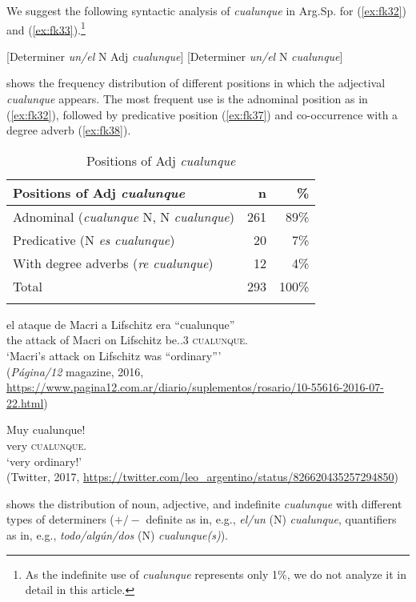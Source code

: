 \documentclass[output=paper,colorlinks,citecolor=brown]{langscibook}
\begin{document}
We suggest the following syntactic analysis of \textit{cualunque} in Arg.Sp. for (\ref{ex:fk32}) and (\ref{ex:fk33}).\footnote{As the indefinite use of \textit{cualunque} represents only 1\%, we do not analyze it in detail in this article.}

\ea\label{ex:fk35} [Determiner \textit{un/el} N Adj \textit{cualunque}] \z
\ea\label{ex:fk36} [Determiner \textit{un/el} N \textit{cualunque}] \z

 shows the frequency distribution of different positions in which the adjectival \textit{cualunque} appears. The most frequent use is the adnominal position as in (\ref{ex:fk32}), followed by predicative position (\ref{ex:fk37}) and co-occurrence with a degree adverb (\ref{ex:fk38}).

\begin{table}
    \begin{tabular}{lrr}
    \lsptoprule
        Positions of Adj \textit{cualunque} & n & \% \\
        \midrule
        Adnominal (\textit{cualunque} N, N \textit{cualunque}) & 261 & 89\%\\
        Predicative (N \textit{es cualunque}) & 20 & 7\%\\
        With degree adverbs (\textit{re cualunque}) & 12 & 4\%\\
        \midrule
        Total & 293 & 100\% \\
        \lspbottomrule
    \end{tabular}
    \caption{Positions of Adj \textit{cualunque}}
    \label{tab:fk3}
\end{table}


\ea\label{ex:fk37}
 \gll el ataque de Macri a Lifschitz era “cualunque”\\
    the attack of Macri on Lifschitz {be.\IPFV.3\SG} \textsc{cualunque.\SG}\\
    \glt ‘Macri's attack on Lifschitz was “ordinary”’\\
    (\textit{Página\slash12} magazine, 2016, \url{https://www.pagina12.com.ar/diario/suplementos/rosario/10-55616-2016-07-22.html})
    \z
    
\ea\label{ex:fk38} \gll  Muy cualunque!\\
    very \textsc{cualunque.\SG}\\
   \glt  ‘very ordinary!’\\
    (Twitter, 2017, \url{https://twitter.com/leo_argentino/status/826620435257294850})
\z

 shows the distribution of noun, adjective, and indefinite \textit{cualunque} with different types of determiners ($+/-$ definite as in, e.g., \textit{el/un} (N) \textit{cualunque}, quantifiers as in, e.g., \textit{todo/algún/dos} (N) \textit{cualunque(s)}).
\end{document}
